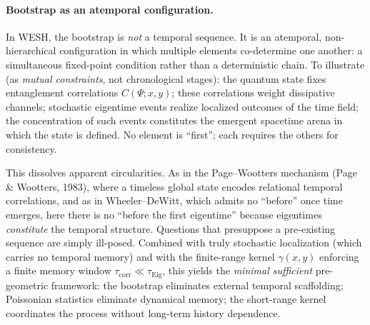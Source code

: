 \documentclass[12pt,a4paper]{article}
\numberwithin{equation}{section}
\begin{document}
\paragraph{Bootstrap as an atemporal configuration.}
In WESH, the bootstrap is \emph{not} a temporal sequence. It is an atemporal, non-hierarchical configuration in which multiple elements co-determine one another: a simultaneous fixed-point condition rather than a deterministic chain. To illustrate (as \emph{mutual constraints}, not chronological stages): the quantum state fixes entanglement correlations $C(\Psi;x,y)$; these correlations weight dissipative channels; stochastic eigentime events realize localized outcomes of the time field; the concentration of such events constitutes the emergent spacetime arena in which the state is defined. No element is ``first''; each requires the others for consistency.

This dissolves apparent circularities. As in the Page--Wootters mechanism (Page \& Wootters, 1983), where a timeless global state encodes relational temporal correlations, and as in Wheeler--DeWitt, which admits no ``before'' once time emerges, here there is no ``before the first eigentime'' because eigentimes \emph{constitute} the temporal structure. Questions that presuppose a pre-existing sequence are simply ill-posed. Combined with truly stochastic localization (which carries no temporal memory) and with the finite-range kernel $\gamma(x,y)$ enforcing a finite memory window $\tau_{\mathrm{corr}}\ll\tau_{\mathrm{Eig}}$, this yields the \emph{minimal sufficient} pre-geometric framework: the bootstrap eliminates external temporal scaffolding; Poissonian statistics eliminate dynamical memory; the short-range kernel coordinates the process without long-term history dependence.
\end{document}
